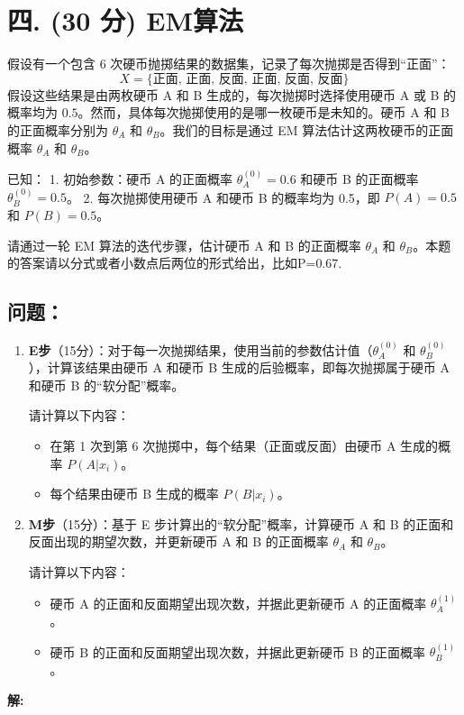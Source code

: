 \documentclass[8pt]{article}
\begin{document}
\vspace{3em}

\section*{四. (30 分) EM算法}
假设有一个包含 6 次硬币抛掷结果的数据集，记录了每次抛掷是否得到“正面”：
\[
X = \{\text{正面, 正面, 反面, 正面, 反面, 反面}\}
\]
假设这些结果是由两枚硬币 A 和 B 生成的，每次抛掷时选择使用硬币 A 或 B 的概率均为 \(0.5\)。然而，具体每次抛掷使用的是哪一枚硬币是未知的。硬币 A 和 B 的正面概率分别为 \( \theta_A \) 和 \( \theta_B \)。我们的目标是通过 EM 算法估计这两枚硬币的正面概率 \( \theta_A \) 和 \( \theta_B \)。

已知：
1. 初始参数：硬币 A 的正面概率 \( \theta_A^{(0)} = 0.6 \) 和硬币 B 的正面概率 \( \theta_B^{(0)} = 0.5 \)。
2. 每次抛掷使用硬币 A 和硬币 B 的概率均为 0.5，即 \( P(A) = 0.5 \) 和 \( P(B) = 0.5 \)。

请通过一轮 EM 算法的迭代步骤，估计硬币 A 和 B 的正面概率 \( \theta_A \) 和 \( \theta_B \)。本题的答案请以分式或者小数点后两位的形式给出，比如P=0.67.

\subsection*{问题：}

\begin{enumerate}
    \item \textbf{E步}（15分）：对于每一次抛掷结果，使用当前的参数估计值（\( \theta_A^{(0)} \) 和 \( \theta_B^{(0)} \)），计算该结果由硬币 A 和硬币 B 生成的后验概率，即每次抛掷属于硬币 A 和硬币 B 的“软分配”概率。
    
    请计算以下内容：
    \begin{itemize}
        \item 在第 1 次到第 6 次抛掷中，每个结果（正面或反面）由硬币 A 生成的概率 \( P(A | x_i) \)。
        \item 每个结果由硬币 B 生成的概率 \( P(B | x_i) \)。
    \end{itemize}

    \item \textbf{M步}（15分）：基于 E 步计算出的“软分配”概率，计算硬币 A 和 B 的正面和反面出现的期望次数，并更新硬币 A 和 B 的正面概率 \( \theta_A \) 和 \( \theta_B \)。

    请计算以下内容：
    \begin{itemize}
        \item 硬币 A 的正面和反面期望出现次数，并据此更新硬币 A 的正面概率 \( \theta_A^{(1)} \)。
        \item 硬币 B 的正面和反面期望出现次数，并据此更新硬币 B 的正面概率 \( \theta_B^{(1)} \)。
    \end{itemize}
\end{enumerate}

\textbf{\large 解:}
\end{document}
